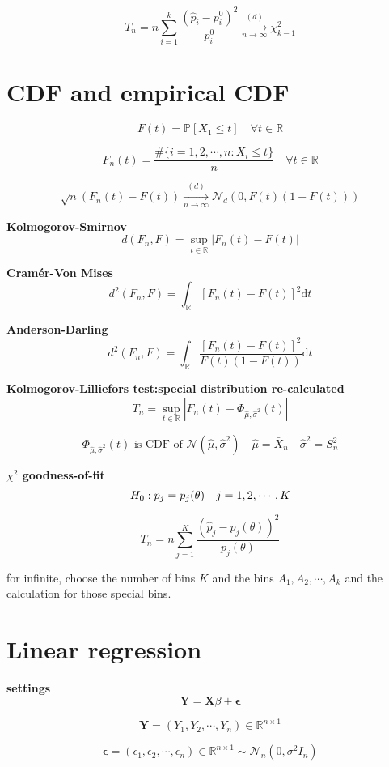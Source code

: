 \documentclass[12pt,a4paper]{article}
\begin{document}
\[
T_n = n \sum_{i = 1}^{k} \frac{( \hat{p}_i-p^0_i )^2}{p^0_i} \xrightarrow[n \rightarrow \infty]{(d)} \chi^2_{k-1}
\]


\section{CDF and empirical CDF}
\[
	F(t) = \mathbb{P}[X_1 \leqslant t] \quad \forall t \in \mathbb{R}
\]

\[
	F_n(t) = \frac{\#\{i = 1, 2, \cdots,n: X_i \leqslant t \}}{n}  \quad \forall t \in \mathbb{R}
\]

\[
\sqrt{n}(F_n(t)-F(t)) \xrightarrow[n \rightarrow \infty]{(d)} \mathcal{N}_d(0,F(t)(1-F(t)))
\]

\textbf{Kolmogorov-Smirnov}
\[
	d(F_n,F) = \sup_{t\in \mathbb{R}} |F_n(t) - F(t)|
\]

\textbf{Cramér-Von Mises}
\[
	d^2(F_n,F) = \int_{\mathbb{R}} [F_n(t) - F(t)]^2\mathrm{d}t
\]

\textbf{Anderson-Darling}
\[
	d^2(F_n,F) = \int_{\mathbb{R}} \frac{[F_n(t) - F(t)]^2}{F(t)(1-F(t))}\mathrm{d}t
\]


\textbf{Kolmogorov-Lilliefors test:special distribution re-calculated}
\[
	T_n = \sup_{t\in \mathbb{R}} |F_n(t)-\Phi_{\hat{\mu},\hat{\sigma}^2}(t)|
\]

\[
\Phi_{\hat{\mu},\hat{\sigma}^2}(t) \mbox{ is CDF of } \mathcal{N}(\hat{\mu},\hat{\sigma}^2) \quad \hat{\mu} = \bar{X}_n \quad \hat{\sigma}^2 = S^2_n
\]

\textbf{$\chi^2$ goodness-of-fit}
\[
H_0: p_j = p_j(\theta) \quad j = 1,2, \cdots, K\\
\]

\[
T_n = n \sum_{j=1}^{K}\frac{(\hat{p}_j-p_j(\theta))^2}{p_j(\theta)}
\]

for infinite, choose the number of bins $K$ and the bins $A_1, A_2, \cdots, A_k$
and the calculation for those special bins.


\section{Linear regression}

\textbf{settings}
\[
\mathbf{Y} = \mathbf{X}\beta + \mathbf{\epsilon}
\]

\[
\mathbf{Y} = (Y_1,Y_2,\cdots,Y_n) \in \mathbb{R}^{n\times 1}
\]

\[
\mathbf{\epsilon} = (\epsilon_1,\epsilon_2,\cdots,\epsilon_n) \in \mathbb{R}^{n\times 1} \sim \mathcal{N}_n(0,\sigma^2I_n)
\]
\end{document}
